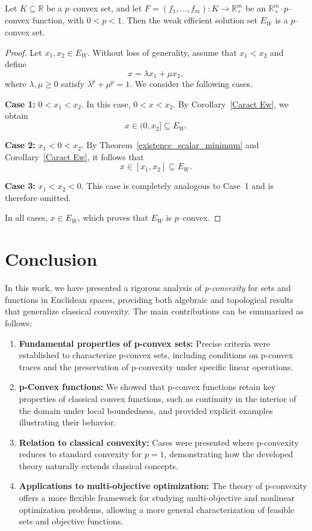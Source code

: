 \documentclass[10pt]{article}
\begin{document}
 \begin{corollary}
Let $K \subseteq \mathbb{R}$ be a $p$--convex set, and let
$F=(f_{1},\ldots,f_{m}):K \to \mathbb{R}^{m}_{+}$ be an
$\mathbb{R}^{m}_{+}$--$p$--convex function, with $0<p<1$.
Then the weak efficient solution set $E_W$ is a $p$--convex set.
\end{corollary}
\begin{proof}
Let $x_{1},x_{2} \in E_W$.
Without loss of generality, assume that $x_{1}<x_{2}$ and define
\[
x=\lambda x_{1}+\mu x_{2},
\]
where $\lambda,\mu \ge 0$ satisfy $\lambda^{p}+\mu^{p}=1$.
We consider the following cases.

\smallskip
\noindent
\textbf{Case 1:} $0<x_{1}<x_{2}$.
In this case, $0<x<x_{2}$.
By Corollary~\ref{Caract Ew}, we obtain
\[
x \in (0,x_{2}] \subseteq E_W.
\]

\smallskip
\noindent
\textbf{Case 2:} $x_{1}<0<x_{2}$.
By Theorem~\ref{existence_scalar_minimum} and Corollary~\ref{Caract Ew},
it follows that
\[
x \in [x_{1},x_{2}] \subseteq E_W.
\]

\smallskip
\noindent
\textbf{Case 3:} $x_{1}<x_{2}<0$.
This case is completely analogous to Case~1 and is therefore omitted.

\smallskip
In all cases, $x \in E_W$, which proves that $E_W$ is $p$--convex.
\end{proof}

\section{Conclusion}

In this work, we have presented a rigorous analysis of \emph{p-convexity} for sets and functions in Euclidean spaces, providing both algebraic and topological results that generalize classical convexity. The main contributions can be summarized as follows:

\begin{enumerate}
    \item \textbf{Fundamental properties of p-convex sets:} Precise criteria were established to characterize p-convex sets, including conditions on p-convex traces and the preservation of p-convexity under specific linear operations.
    
    \item \textbf{p-Convex functions:} We showed that p-convex functions retain key properties of classical convex functions, such as continuity in the interior of the domain under local boundedness, and provided explicit examples illustrating their behavior.
    
    \item \textbf{Relation to classical convexity:} Cases were presented where p-convexity reduces to standard convexity for $p=1$, demonstrating how the developed theory naturally extends classical concepts.
    
    \item \textbf{Applications to multi-objective optimization:} The theory of p-convexity offers a more flexible framework for studying multi-objective and nonlinear optimization problems, allowing a more general characterization of feasible sets and objective functions.
\end{enumerate}
\end{document}
